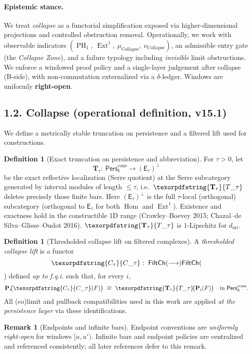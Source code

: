 \documentclass[11pt]{article}
\numberwithin{equation}{section}
\theoremstyle{plain}
\theoremstyle{definition}
\theoremstyle{remark}
\DeclareMathOperator{\Ext}{Ext}
\DeclareMathOperator{\Hom}{Hom}
\DeclareMathOperator{\PH}{PH}
\newcommand{\Pers}{\mathsf{Pers}}
\theoremstyle{plain}
\theoremstyle{definition}
\numberwithin{equation}{section}
\theoremstyle{definition}
\newtheorem{definition}[theorem]{Definition}
\newtheorem{remark}[theorem]{Remark}
\DeclareRobustCommand{\FiltCh}[1]{\mathsf{FiltCh}(#1)}
\DeclareRobustCommand{\Ttau}{\texorpdfstring{\ensuremath{\mathbf{T}_{\tau}}}{T\_\tau}}
\DeclareRobustCommand{\Ctau}{\texorpdfstring{\ensuremath{C_{\tau}}}{C\_\tau}}
\numberwithin{equation}{section}
\theoremstyle{plain}
\theoremstyle{definition}
\theoremstyle{remark}
\newcommand{\Perscons}{\Pers^{\mathrm{cons}}_k}
\newcommand{\intdist}{d_{\mathrm{int}}}
\newcommand{\Ecat}{\mathsf{E}_\tau}
\newcommand{\Orth}{(\mathsf{E}_\tau)^{\perp}}
\providecommand{\Cfun}[1]{\mathsf{C}_{#1}}
\providecommand{\Tfun}[1]{\mathbf{T}_{#1}}
\providecommand{\Ctau}{\Cfun{\tau}}
\providecommand{\Ttau}{\Tfun{\tau}}
\providecommand{\intdist}{d_{\mathrm{int}}}  %
\begin{document}
\paragraph{Epistemic stance.}
We treat \emph{collapse} as a functorial simplification exposed via higher-dimensional projections and controlled obstruction removal. Operationally, we work with observable indicators \((\PH_1,\ \Ext^1,\ \mu_{\mathrm{Collapse}},\ \nu_{\mathrm{Collapse}})\), an admissible entry gate (the \emph{Collapse Zone}), and a failure typology including \emph{invisible} limit obstructions. We enforce a windowed proof policy and a single-layer judgement after collapse (B-side), with non-commutation externalized via a \(\delta\)-ledger. Windows are uniformly \textbf{right-open}.

\subsection*{1.2. Collapse (operational definition, v15.1)}
We define a metrically stable truncation on persistence and a filtered lift used for constructions.

\begin{definition}[Exact truncation on persistence and abbreviation]\label{def:Ttau}
For \(\tau>0\), let
\[
\mathbf{T}_\tau:\ \Perscons\longrightarrow \Orth
\]
be the exact reflective localization (Serre quotient) at the Serre subcategory generated by interval modules of length \(\le \tau\), i.e.\ \(\Ttau\) deletes precisely those finite bars. Here \(\Orth\) is the full \(\tau\)-local (orthogonal) subcategory (orthogonal to \(\Ecat\) for both \(\Hom\) and \(\Ext^1\)). Existence and exactness hold in the constructible 1D range (Crawley--Boevey 2015; Chazal--de Silva--Glisse--Oudot 2016). \(\Ttau\) is \(1\)-Lipschitz for \(\intdist\).
\end{definition}

\begin{definition}[Thresholded collapse lift on filtered complexes]\label{def:Ctau}
A \emph{thresholded collapse lift} is a functor
\[
\Ctau:\ \FiltCh\longrightarrow \FiltCh
\]
defined \emph{up to f.q.i.} such that, for every \(i\),
\[
\mathbf{P}_i\!\big(\Ctau(F)\big)\ \cong\ \Ttau\!\big(\mathbf{P}_i(F)\big)\quad\text{in }\Perscons.
\]
All (co)limit and pullback compatibilities used in this work are applied \emph{at the persistence layer} via these identifications.
\end{definition}

\begin{remark}[Endpoints and infinite bars]\label{rem:endpoints-infinite-bars}
Endpoint conventions are \emph{uniformly right-open} for windows \([u,u')\). Infinite bars and endpoint policies are centralized and referenced consistently; all later references defer to this remark.
\end{remark}
\end{document}
